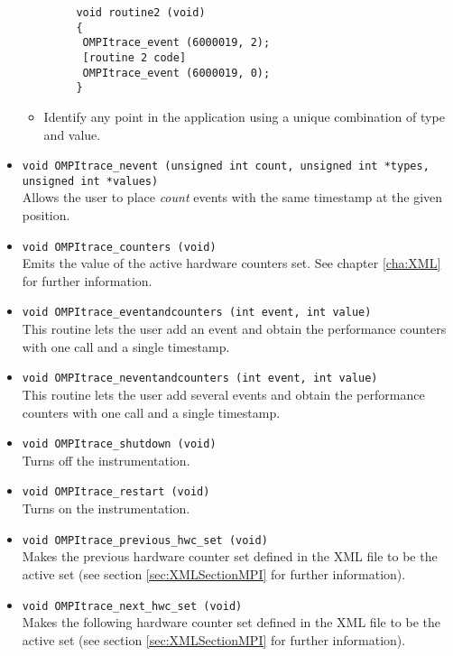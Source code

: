 \begin{itemize}
\begin{itemize}
\begin{verbatim}
     void routine2 (void)
     {
      OMPItrace_event (6000019, 2);
      [routine 2 code]
      OMPItrace_event (6000019, 0);
     }
   \end{verbatim}
   \item Identify any point in the application using a unique combination of type and value.
  \end{itemize}

 \item {\tt void OMPItrace\_nevent (unsigned int count, unsigned int *types, unsigned int *values)}\\
  Allows the user to place {\em count} events with the same timestamp at the given position.

 \item {\tt void OMPItrace\_counters (void)}\\
  Emits the value of the active hardware counters set. See chapter \ref{cha:XML} for further information.

 \item {\tt void OMPItrace\_eventandcounters (int event, int value)}\\
  This routine lets the user add an event and obtain the performance counters with one call and a single timestamp.

 \item {\tt void OMPItrace\_neventandcounters (int event, int value)}\\
  This routine lets the user add several events and obtain the performance counters with one call and a single timestamp.

 \item {\tt void OMPItrace\_shutdown (void)}\\
  Turns off the instrumentation.

 \item {\tt void OMPItrace\_restart (void)}\\
  Turns on the instrumentation.

 \item {\tt void OMPItrace\_previous\_hwc\_set (void)}\\
  Makes the previous hardware counter set defined in the XML file to be the active set (see section \ref{sec:XMLSectionMPI} for further information).

 \item {\tt void OMPItrace\_next\_hwc\_set (void)}\\
  Makes the following hardware counter set defined in the XML file to be the active set (see section \ref{sec:XMLSectionMPI} for further information).


\end{itemize}

